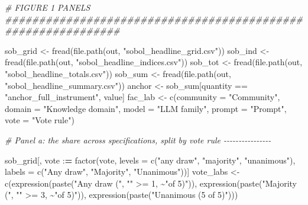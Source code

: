\documentclass[
  11pt,
]{article}
\newenvironment{Shaded}{\begin{snugshade}}{\end{snugshade}}
\newcommand{\AttributeTok}[1]{\textcolor[rgb]{0.77,0.63,0.00}{#1}}
\newcommand{\CommentTok}[1]{\textcolor[rgb]{0.56,0.35,0.01}{\textit{#1}}}
\newcommand{\DecValTok}[1]{\textcolor[rgb]{0.00,0.00,0.81}{#1}}
\newcommand{\ErrorTok}[1]{\textcolor[rgb]{0.64,0.00,0.00}{\textbf{#1}}}
\newcommand{\FunctionTok}[1]{\textcolor[rgb]{0.00,0.00,0.00}{#1}}
\newcommand{\NormalTok}[1]{#1}
\newcommand{\OtherTok}[1]{\textcolor[rgb]{0.56,0.35,0.01}{#1}}
\newcommand{\SpecialCharTok}[1]{\textcolor[rgb]{0.00,0.00,0.00}{#1}}
\newcommand{\StringTok}[1]{\textcolor[rgb]{0.31,0.60,0.02}{#1}}
\begin{document}
\begin{Shaded}
\begin{Highlighting}[]
\CommentTok{\# FIGURE 1 PANELS \#\#\#\#\#\#\#\#\#\#\#\#\#\#\#\#\#\#\#\#\#\#\#\#\#\#\#\#\#\#\#\#\#\#\#\#\#\#\#\#\#\#\#\#\#\#\#\#\#\#\#\#\#\#\#\#\#\#\#\#\#}

\NormalTok{sob\_grid }\OtherTok{\textless{}{-}} \FunctionTok{fread}\NormalTok{(}\FunctionTok{file.path}\NormalTok{(out, }\StringTok{"sobol\_headline\_grid.csv"}\NormalTok{))}
\NormalTok{sob\_ind }\OtherTok{\textless{}{-}} \FunctionTok{fread}\NormalTok{(}\FunctionTok{file.path}\NormalTok{(out, }\StringTok{"sobol\_headline\_indices.csv"}\NormalTok{))}
\NormalTok{sob\_tot }\OtherTok{\textless{}{-}} \FunctionTok{fread}\NormalTok{(}\FunctionTok{file.path}\NormalTok{(out, }\StringTok{"sobol\_headline\_totals.csv"}\NormalTok{))}
\NormalTok{sob\_sum }\OtherTok{\textless{}{-}} \FunctionTok{fread}\NormalTok{(}\FunctionTok{file.path}\NormalTok{(out, }\StringTok{"sobol\_headline\_summary.csv"}\NormalTok{))}
\NormalTok{anchor }\OtherTok{\textless{}{-}}\NormalTok{ sob\_sum[quantity }\SpecialCharTok{==} \StringTok{"anchor\_full\_instrument"}\NormalTok{, value]}
\NormalTok{fac\_lab }\OtherTok{\textless{}{-}} \FunctionTok{c}\NormalTok{(}\AttributeTok{community =} \StringTok{"Community"}\NormalTok{, }\AttributeTok{domain =} \StringTok{"Knowledge domain"}\NormalTok{,}
             \AttributeTok{model =} \StringTok{"LLM family"}\NormalTok{, }\AttributeTok{prompt =} \StringTok{"Prompt"}\NormalTok{, }\AttributeTok{vote =} \StringTok{"Vote rule"}\NormalTok{)}

\CommentTok{\# Panel a: the share across specifications, split by vote rule {-}{-}{-}{-}{-}{-}{-}{-}{-}{-}{-}{-}{-}{-}{-}{-}}

\NormalTok{sob\_grid[, vote }\SpecialCharTok{:}\ErrorTok{=} \FunctionTok{factor}\NormalTok{(vote, }\AttributeTok{levels =} \FunctionTok{c}\NormalTok{(}\StringTok{"any draw"}\NormalTok{, }\StringTok{"majority"}\NormalTok{, }\StringTok{"unanimous"}\NormalTok{),}
                          \AttributeTok{labels =} \FunctionTok{c}\NormalTok{(}\StringTok{"Any draw"}\NormalTok{, }\StringTok{"Majority"}\NormalTok{, }\StringTok{"Unanimous"}\NormalTok{))]}
\NormalTok{vote\_labs }\OtherTok{\textless{}{-}} \FunctionTok{c}\NormalTok{(}\FunctionTok{expression}\NormalTok{(}\FunctionTok{paste}\NormalTok{(}\StringTok{"Any draw ("}\NormalTok{, }\StringTok{""} \SpecialCharTok{\textgreater{}=} \DecValTok{1}\NormalTok{, }\SpecialCharTok{\textasciitilde{}}\StringTok{"of 5)"}\NormalTok{)),}
               \FunctionTok{expression}\NormalTok{(}\FunctionTok{paste}\NormalTok{(}\StringTok{"Majority ("}\NormalTok{, }\StringTok{""} \SpecialCharTok{\textgreater{}=} \DecValTok{3}\NormalTok{, }\SpecialCharTok{\textasciitilde{}}\StringTok{"of 5)"}\NormalTok{)),}
               \FunctionTok{expression}\NormalTok{(}\FunctionTok{paste}\NormalTok{(}\StringTok{"Unanimous (5 of 5)"}\NormalTok{)))}


\end{Highlighting}
\end{Shaded}
\end{document}
